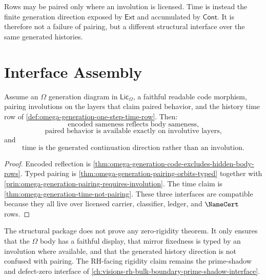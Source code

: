 \begin{principle}
\label{prin:omega-generation-pairing-time-different-sources}
Rows may be paired only where an involution is licensed. Time is instead
the finite generation direction exposed by $\mathsf{Ext}$ and accumulated
by $\mathsf{Cont}$. It is therefore not a failure of pairing, but a
different structural interface over the same generated histories.
\end{principle}

\section{Interface Assembly}
\label{sec:omega-generation-interface-assembly}

\begin{theorem}
\label{thm:omega-generation-structure-package}
Assume an $\Omega$ generation diagram in $\mathsf{Lic}_{\Omega}$, a
faithful readable code morphism, pairing involutions on the layers that
claim paired behavior, and the history time row of
\autoref{def:omega-generation-one-step-time-row}. Then:
$$
\text{encoded sameness reflects body sameness,}
$$
$$
\text{paired behavior is available exactly on involutive layers,}
$$
and
$$
\text{time is the generated continuation direction rather than an involution.}
$$
\end{theorem}

\begin{proof}
Encoded reflection is
\autoref{thm:omega-generation-code-excludes-hidden-body-rows}. Typed
pairing is \autoref{thm:omega-generation-pairing-orbits-typed} together
with \autoref{prin:omega-generation-pairing-requires-involution}. The time
claim is \autoref{thm:omega-generation-time-not-pairing}. These three
interfaces are compatible because they all live over licensed carrier,
classifier, ledger, and $\NameCert$ rows.
\end{proof}

\begin{principle}
\label{prin:omega-generation-prime-shadow-connection}
The structural package does not prove any zero-rigidity theorem. It only
ensures that the $\Omega$ body has a faithful display, that mirror
fixedness is typed by an involution where available, and that the generated
history direction is not confused with pairing. The RH-facing rigidity
claim remains the prime-shadow and defect-zero interface of
\autoref{ch:visions-rh-bulk-boundary-prime-shadow-interface}.
\end{principle}

